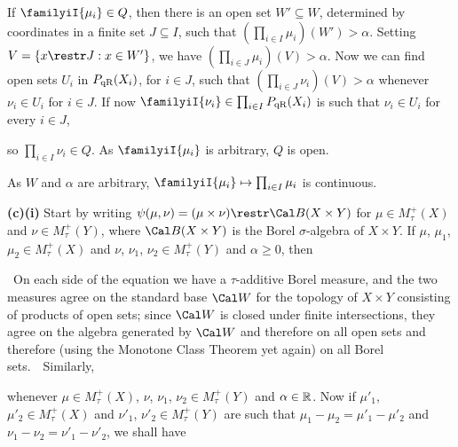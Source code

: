 {

\noindent If $\familyiI{\mu_i}\in Q$, then
there is an open set $W'\subseteq W$, determined by coordinates in a
finite set $J\subseteq I$, such that $(\prod_{i\in I}\mu_i)(W')>\alpha$.
Setting $V=\{x\restr J:x\in W'\}$, we have
$(\prod_{i\in J}\mu_i)(V)>\alpha$.   Now we can find open sets $U_i$
in $P_{\text{qR}}(X_i)$, for $i\in J$, such that
$(\prod_{i\in J}\nu_i)(V)>\alpha$ whenever $\nu_i\in U_i$ for $i\in J$.
If now
$\familyiI{\nu_i}\in\prod_{i\in I}\PqR(X_i)$ is such that
$\nu_i\in U_i$ for every $i\in J$,


\noindent so $\prod_{i\in I}\nu_i\in Q$.   As $\familyiI{\mu_i}$ is
arbitrary, $Q$ is open.

As $W$ and $\alpha$ are arbitrary,
$\familyiI{\mu_i}\mapsto\prod_{i\in I}\mu_i$ is continuous.

\medskip

{\bf (c)(i)} Start by writing
$\psi(\mu,\nu)=(\mu\times\nu)\restr\Cal B(X\times Y)$ for
$\mu\in M^+_{\tau}(X)$ and $\nu\in M^+_{\tau}(Y)$,
where $\Cal B(X\times Y)$ is the Borel $\sigma$-algebra of $X\times Y$.
If $\mu$, $\mu_1$, $\mu_2\in M^+_{\tau}(X)$ and
$\nu$, $\nu_1$, $\nu_2\in M^+_{\tau}(Y)$ and $\alpha\ge 0$, then


\noindent\Prf\ On each side of the equation we have a $\tau$-additive
Borel measure, and the two measures agree on the standard base $\Cal W$
for the topology of $X\times Y$ consisting of products of open sets;
since $\Cal W$ is closed under finite intersections, they agree on the
algebra generated by $\Cal W$ and therefore on all open sets and
therefore (using the Monotone Class Theorem yet again) on all Borel
sets.\ \QeD\   Similarly,


\noindent whenever $\mu\in M^+_{\tau}(X)$, $\nu$, $\nu_1$,
$\nu_2\in M^+_{\tau}(Y)$ and $\alpha\in\Bbb R$.
Now if $\mu'_1$, $\mu'_2\in M^+_{\tau}(X)$ and $\nu'_1$,
$\nu'_2\in M^+_{\tau}(Y)$ are such that $\mu_1-\mu_2=\mu'_1-\mu'_2$ and
$\nu_1-\nu_2=\nu'_1-\nu'_2$, we shall have

}
